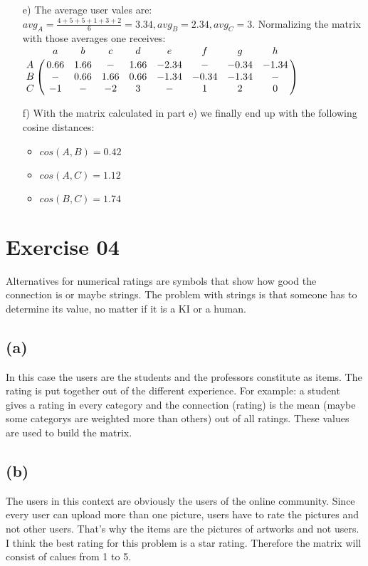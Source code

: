 \documentclass[11pt,a4paper]{scrartcl}
\begin{document}
\begin{itemize}
	\item[e)] The average user vales are: $avg_A = \frac{4+5+5+1+3+2}{6} = 3.34, avg_B = 2.34, avg_C = 3$. Normalizing the matrix with those averages one receives: \\
$\bordermatrix{
  & a	& b   & c & d & e & f & g & h  \cr
A & 0.66 & 1.66 & - & 1.66 & -2.34 & - & -0.34 & -1.34 \cr
B & - & 0.66 & 1.66 & 0.66 & -1.34 & -0.34 & -1.34 & - \cr
C & -1 & - & -2 & 3 & - & 1 & 2 & 0 \cr
}
$ 
	\item[f)] With the matrix calculated in part e) we finally end up with the following cosine distances:
	\begin{itemize}
		\item $cos(A,B) = 0.42 $
		\item $cos(A,C) = 1.12$
		\item $cos(B,C) = 1.74 $
	\end{itemize}
	\end{itemize}

\section*{Exercise 04}

Alternatives for numerical ratings are symbols that show how good the connection is or maybe strings. The problem with strings is that someone has to determine its value, no matter if it is a KI or a human.

\subsection*{(a)}

In this case the users are the students and the professors constitute as items. The rating is put together out of the different experience. For example: a student gives a rating in every category and the connection (rating) is the mean (maybe some categorys are weighted more than others) out of all ratings. These values are used to build the matrix.

\subsection*{(b)}

The users in this context are obviously the users of the online community. Since every user can upload more than one picture, users have to rate the pictures and not other users. That's why the items are the pictures of artworks and not users. I think the best rating for this problem is a star rating. Therefore the matrix will consist of calues from 1 to 5.
\end{document}
